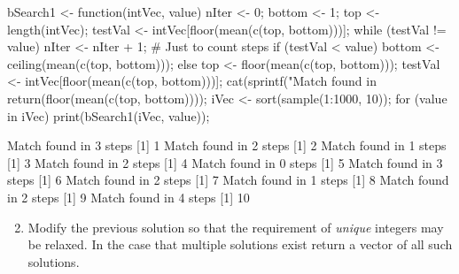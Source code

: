 \documentclass[10pt,letterpaper]{article}
\begin{document}
\begin{Solution}
\begin{Schunk}
\begin{Sinput}
 bSearch1 <- function(intVec, value) {
   nIter <- 0;
   bottom <- 1;
   top <- length(intVec);
   testVal <- intVec[floor(mean(c(top, bottom)))];
   while (testVal != value) {
     nIter <- nIter + 1;   # Just to count steps
   if (testVal < value) {
     bottom <- ceiling(mean(c(top, bottom)));
   } else {
     top <- floor(mean(c(top, bottom)));
   }
   testVal <- intVec[floor(mean(c(top, bottom)))];
   }
   cat(sprintf("Match found in %d steps\n", nIter));
   return(floor(mean(c(top, bottom))));
 }
 iVec <- sort(sample(1:1000, 10));
 for (value in iVec) {
   print(bSearch1(iVec, value));
 }
\end{Sinput}
\begin{Soutput}
Match found in 3 steps
[1] 1
Match found in 2 steps
[1] 2
Match found in 1 steps
[1] 3
Match found in 2 steps
[1] 4
Match found in 0 steps
[1] 5
Match found in 3 steps
[1] 6
Match found in 2 steps
[1] 7
Match found in 1 steps
[1] 8
Match found in 2 steps
[1] 9
Match found in 4 steps
[1] 10
\end{Soutput}
\end{Schunk}
\end{Solution}

\begin{enumerate}
\begin{enumerate}
\setcounter{enumii}{1}

  \item Modify the previous solution so that the requirement of \emph{unique} integers may be relaxed.  In the case that multiple solutions exist return a vector of all such solutions.
  \end{enumerate}
\end{enumerate}
\end{document}
